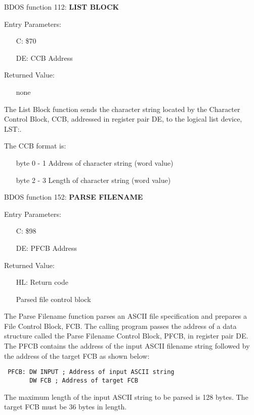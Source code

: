 BDOS function 112: \textbf{LIST BLOCK}

Entry Parameters:
\begin{itemize}
\item[] C: \$70
\item[] DE: CCB Address
\end{itemize}

Returned Value:
\begin{itemize}
\item[] none
\end{itemize}

The List Block function sends the character string located by the
Character Control Block, CCB, addressed in register pair DE, to the
logical list device, LST:.

The CCB format is:
\begin{itemize}
\item[byte] 0 - 1 Address of character string (word value)
\item[byte] 2 - 3 Length of character string (word value)
\end{itemize}

BDOS function 152: \textbf{PARSE FILENAME}

Entry Parameters:
\begin{itemize}
\item[] C: \$98
\item[] DE: PFCB Address
\end{itemize}

Returned Value:
\begin{itemize}
\item[] HL: Return code
\item[] Parsed file control block
\end{itemize}

The Parse Filename function parses an ASCII file specification and
prepares a File Control Block, FCB. The calling program passes the
address of a data structure called the Parse Filename Control Block,
PFCB, in register pair DE. The PFCB contains the address of the input
ASCII filename string followed by the address of the target FCB as
shown below:

\begin{verbatim}
 PFCB: DW INPUT ; Address of input ASCII string
       DW FCB ; Address of target FCB
\end{verbatim}

The maximum length of the input ASCII string to be parsed is 128
bytes. The target FCB must be 36 bytes in length.

